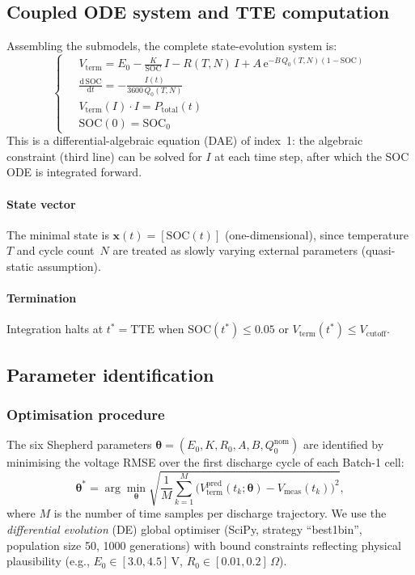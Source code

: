\documentclass[5p,times,number]{elsarticle}
\begin{document}
\subsection{Coupled ODE system and TTE computation}\label{sec:ode}
Assembling the submodels, the complete state-evolution system is:
\begin{equation}\label{eq:system}
\left\{\;
\begin{aligned}
& V_{\mathrm{term}} = E_0 - \frac{K}{\mathrm{SOC}}\,I - R(T,N)\,I + A\,\mathrm{e}^{-B\,Q_0(T,N)(1-\mathrm{SOC})}\\[6pt]
& \frac{\mathrm{d}\,\mathrm{SOC}}{\mathrm{d}t} = -\frac{I(t)}{3600\,Q_0(T,N)}\\[6pt]
& V_{\mathrm{term}}(I) \cdot I = P_{\mathrm{total}}(t)\\[4pt]
& \mathrm{SOC}(0) = \mathrm{SOC}_0
\end{aligned}
\right.
\end{equation}
This is a differential-algebraic equation (DAE) of index~1: the algebraic constraint (third line) can be solved for $I$ at each time step, after which the SOC ODE is integrated forward.
\paragraph{State vector}
The minimal state is $\mathbf{x}(t) = [\mathrm{SOC}(t)]$ (one-dimensional), since temperature~$T$ and cycle count~$N$ are treated as slowly varying external parameters (quasi-static assumption).
\paragraph{Termination}
Integration halts at $t^* = \mathrm{TTE}$ when $\mathrm{SOC}(t^*) \le 0.05$ or $V_{\mathrm{term}}(t^*) \le V_{\mathrm{cutoff}}$.

\subsection{Parameter identification}\label{sec:paramfit}
\subsubsection{Optimisation procedure}
The six Shepherd parameters $\boldsymbol{\theta} = (E_0, K, R_0, A, B, Q_0^{\mathrm{nom}})$ are identified by minimising the voltage RMSE over the first discharge cycle of each Batch-1 cell:
\begin{equation}\label{eq:obj}
\boldsymbol{\theta}^* = \arg\min_{\boldsymbol{\theta}} \sqrt{\frac{1}{M}\sum_{k=1}^{M}\bigl(V_{\mathrm{term}}^{\mathrm{pred}}(t_k;\boldsymbol{\theta}) - V_{\mathrm{meas}}(t_k)\bigr)^2},
\end{equation}
where $M$ is the number of time samples per discharge trajectory.
We use the \emph{differential evolution} (DE) global optimiser (SciPy, strategy ``best1bin'', population size 50, 1000 generations) with bound constraints reflecting physical plausibility (e.g., $E_0 \in [3.0, 4.5]$\,V, $R_0 \in [0.01, 0.2]$\,$\Omega$).
\end{document}

